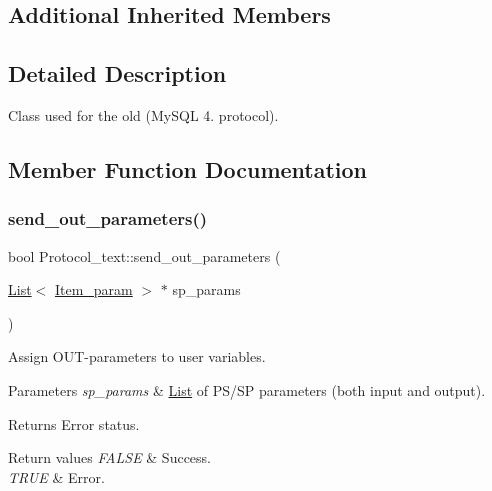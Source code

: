 \subsection*{Additional Inherited Members}


\subsection{Detailed Description}
Class used for the old (My\+S\+QL 4. protocol). 

\subsection{Member Function Documentation}
\mbox{\label{classProtocol__text_ae0e360cdf482e877b4bd1e73b66db5d7}} 
\subsubsection{\texorpdfstring{send\+\_\+out\+\_\+parameters()}{send\_out\_parameters()}}
{\footnotesize\ttfamily bool Protocol\+\_\+text\+::send\+\_\+out\+\_\+parameters (\begin{DoxyParamCaption}\item[{\mbox{\hyperlink{classList}{List}}$<$ \mbox{\hyperlink{classItem__param}{Item\+\_\+param}} $>$ $\ast$}]{sp\+\_\+params }\end{DoxyParamCaption})\hspace{0.3cm}{\ttfamily [virtual]}}

Assign O\+UT-\/parameters to user variables.


\begin{DoxyParams}{Parameters}
{\em sp\+\_\+params} & \mbox{\hyperlink{classList}{List}} of P\+S/\+SP parameters (both input and output).\\
\hline
\end{DoxyParams}
\begin{DoxyReturn}{Returns}
Error status. 
\end{DoxyReturn}

\begin{DoxyRetVals}{Return values}
{\em F\+A\+L\+SE} & Success. \\
\hline
{\em T\+R\+UE} & Error. \\
\hline
\end{DoxyRetVals}



